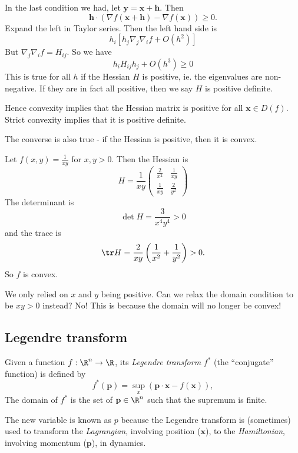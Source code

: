 \documentclass[a4paper]{article}
\begin{document}
In the last condition we had, let $\mathbf{y} = \mathbf{x} + \mathbf{h}$. Then
\[
  \mathbf{h} \cdot (\nabla f(\mathbf{x} + \mathbf{h}) - \nabla f(\mathbf{x})) \geq 0.
\]
Expand the left in Taylor series. Then the left hand side is
\[
  h_i [h_j \nabla_j \nabla_i f + O(h^2)]
\]
But $\nabla_j \nabla_i f = H_{ij}$. So we have
\[
  h_i H_{ij}h_j + O(h^3) \geq 0
\]
This is true for all $h$ if the Hessian $H$ is positive, ie. the eigenvalues are non-negative. If they are in fact all positive, then we say $H$ is positive definite.

Hence convexity implies that the Hessian matrix is positive for all $\mathbf{x}\in D(f)$. Strict convexity implies that it is positive definite.

The converse is also true - if the Hessian is positive, then it is convex.

\begin{eg}
  Let $f(x, y) = \frac{1}{xy}$ for $x, y > 0$. Then the Hessian is
  \[
    H = \frac{1}{xy}
    \begin{pmatrix}
      \frac{2}{x^2} & \frac{1}{xy}\\
      \frac{1}{xy} & \frac{2}{y^2}
    \end{pmatrix}
  \]
  The determinant is
  \[
    \det H = \frac{3}{x^4y^4} > 0
  \]
  and the trace is
  \[
    \tr H = \frac{2}{xy}\left(\frac{1}{x^2} + \frac{1}{y^2}\right) > 0.
  \]
  So $f$ is convex.

  We only relied on $x$ and $y$ being positive. Can we relax the domain condition to be $xy > 0$ instead? No! This is because the domain will no longer be convex! 
\end{eg}

\subsection{Legendre transform}
\begin{defi}
  Given a function $f: \R^n \to \R$, its \emph{Legendre transform} $f^*$ (the ``conjugate'' function) is defined by
  \[
    f^*(\mathbf{p}) = \sup_{x}(\mathbf{p}\cdot \mathbf{x} - f(\mathbf{x})),
  \]
  The domain of $f^*$ is the set of $\mathbf{p}\in \R^n$ such that the supremum is finite.
\end{defi}
The new variable is known as $p$ because the Legendre transform is (sometimes) used to transform the \emph{Lagrangian}, involving position ($\mathbf{x}$), to the \emph{Hamiltonian}, involving momentum ($\mathbf{p}$), in dynamics.
\end{document}
